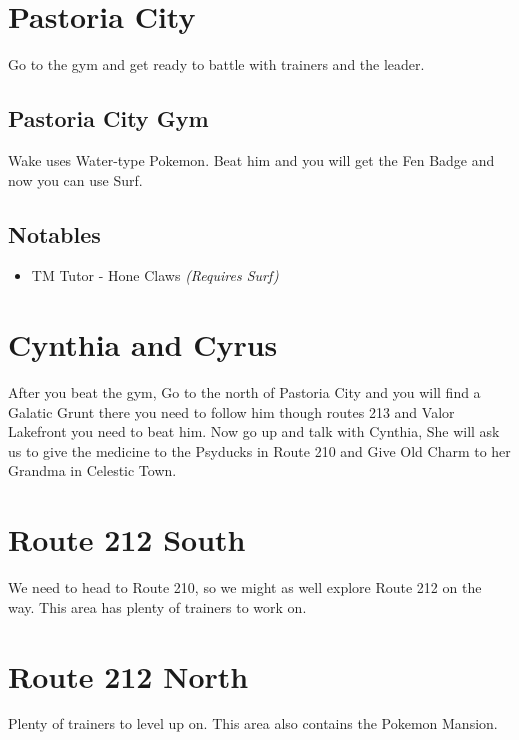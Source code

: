 \documentclass[11pt]{article}
\begin{document}



\section{Pastoria City}\label{sec:pastoria-city}
Go to the gym and get ready to battle with trainers and the leader.

\subsection{Pastoria City Gym}\label{subsec:pastoria-city-gym}
Wake uses Water-type Pokemon.
Beat him and you will get the Fen Badge and now you can use Surf.

\subsection{Notables}\label{subsec:notables-pastoria-city}

\begin{itemize}
    \item TM Tutor - Hone Claws \emph{(Requires Surf)}
\end{itemize}

\section{Cynthia and Cyrus}\label{sec:cynthia-and-cyrus}
After you beat the gym, Go to the north of Pastoria City
and you will find a Galatic Grunt there you need to follow him though routes 213
and Valor Lakefront you need to beat him.
Now go up and talk with Cynthia, She will ask us to give the medicine to the
Psyducks in Route 210 and Give Old Charm to her Grandma in Celestic Town.



\section{Route 212 South}\label{sec:route-212-(south)}
We need to head to Route 210, so we might as well explore Route 212 on the way.
This area has plenty of trainers to work on.




\section{Route 212 North}\label{sec:route-212-north}
Plenty of trainers to level up on.
This area also contains the Pokemon Mansion.
\end{document}
